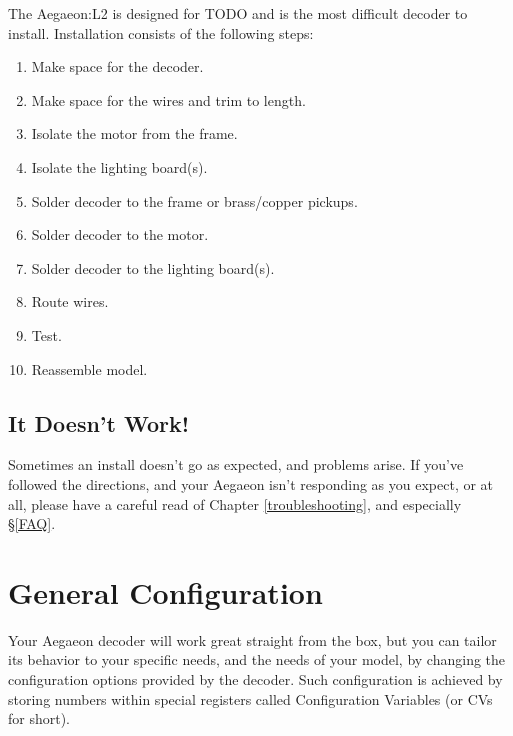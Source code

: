 \documentclass[12pt,letterpaper,draft]{memoir} %
\begin{document}
The Aegaeon:L2 is designed for TODO and is the most difficult decoder to install. Installation consists of the following steps:
\begin{enumerate}
\item Make space for the decoder.
\item Make space for the wires and trim to length.
\item Isolate the motor from the frame.
\item Isolate the lighting board(s).
\item Solder decoder to the frame or brass/copper pickups.
\item Solder decoder to the motor.
\item Solder decoder to the lighting board(s).
\item Route wires.
\item Test.
\item Reassemble model.
\end{enumerate}


\section{It Doesn't Work!}

Sometimes an install doesn't go as expected, and problems arise. If you've followed the directions, and your Aegaeon isn't responding as you expect, or at all, please have a careful read of Chapter \ref{troubleshooting}, and especially \S\ref{FAQ}.

\chapter{General Configuration}
\label{generalconfiguration}
Your Aegaeon decoder will work great straight from the box, but you can tailor its behavior to your specific needs, and the needs of your model, by changing the configuration options provided by the decoder. Such configuration is achieved by storing numbers within special registers called Configuration Variables (or CVs for short).
\end{document}
